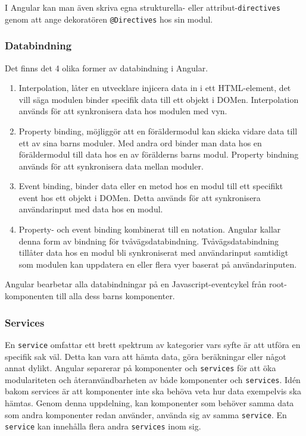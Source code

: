 I Angular kan man även skriva egna strukturella- eller attribut-\texttt{directives} genom att ange dekoratören \texttt{@Directives} hos sin modul. \cite{angular-components}

\subsubsection{Databindning}
\label{angular-data-binding}
Det finns det 4 olika former av databindning i Angular. \cite{angular-components} 
\begin{enumerate}
    \item Interpolation, låter en utvecklare injicera data in i ett HTML-element, det vill säga modulen binder specifik data till ett objekt i DOMen. Interpolation används för att synkronisera data hos modulen med vyn.
    
    \item Property binding, möjliggör att en föräldermodul kan skicka vidare data till ett av sina barns moduler. Med andra ord binder man data hos en föräldermodul till data hos en av förälderns barns modul. Property bindning används för att synkronisera data mellan moduler. \cite{angular-databinding}

    \item Event binding, binder data eller en metod hos en modul till ett specifikt event hos ett objekt i DOMen. Detta används för att synkronisera användarinput med data hos en modul.

    \item Property- och event binding kombinerat till en notation. Angular kallar denna form av bindning för tvåvägsdatabindning. Tvåvägsdatabindning tillåter data hos en modul bli synkroniserat med användarinput samtidigt som modulen kan uppdatera en eller flera vyer baserat på användarinputen.

\end{enumerate}

Angular bearbetar alla databindningar på en Javascript-eventcykel från root-komponenten till alla dess barns komponenter. \cite{angular-components}


\subsubsection{Services}
\label{angular-services}
En \texttt{service} omfattar ett brett spektrum av kategorier vars syfte är att utföra en specifik sak väl. Detta kan vara att hämta data, göra beräkningar eller något annat dylikt. Angular separerar på komponenter och \texttt{services} för att öka modulariteten och återanvändbarheten av både komponenter och \texttt{services}. Idén bakom services är att komponenter inte ska behöva veta hur data exempelvis ska hämtas. Genom denna uppdelning, kan komponenter som behöver samma data som andra komponenter redan använder, använda sig av samma \texttt{service}. \cite{angular-services} En \texttt{service} kan innehålla flera andra \texttt{services} inom sig.

